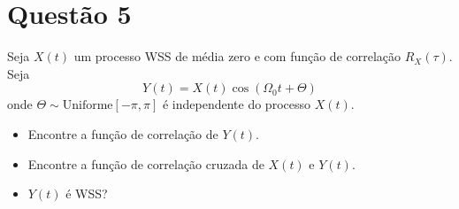 \section{Questão 5}

Seja $X(t)$ um processo WSS de média zero e com função de correlação $R_X(\tau)$. 
Seja
$$Y(t) = X(t) \cos(\Omega_0 t + \Theta)$$
onde $\Theta \sim \text{Uniforme}[-\pi, \pi]$ é independente do processo $X(t)$.
%
\begin{itemize}
    \item [a)] Encontre a função de correlação de $Y(t)$.
    \item [b)] Encontre a função de correlação cruzada de $X(t)$ e $Y(t)$.
    \item [c)] $Y(t)$ é WSS?
\end{itemize}

